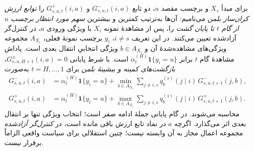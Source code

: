 برای مبدأ $X_s$ و برچسب مقصد $u$، دو تابع
$G^-_{s,u,t}(i,a)$ و $G^+_{s,u,t}(i,a)$
را \emph{توابع ارزش کران‌ساز بلمن} می‌نامیم: آن‌ها به‌ترتیب کمترین و بیشترین \emph{سهم مورد انتظار برچسب $u$ از گام $t$ تا پایان گشت} را، پس از مشاهدهٔ نمونه $X_i$ با ویژگی ورودی $a$، در کنترل‌گر آزادشده تعیین می‌کنند. در این تعریف $i\ne s$، $y_i$ برچسب نمونهٔ فعلی، $A_{X_i}$ مجموعه ویژگی‌های مشاهده‌شدهٔ آن و $b\in A_{X_i}$ ویژگی انتخابیِ انتقال بعدی است. پاداش مشاهدهٔ گام $t$ برابر $\alpha_t^{(H)}\mathbf1\{y_i=u\}$ است. با شرط پایانی $G^\pm_{s,u,H+1}(i,a)=0$، \emph{بازگشت‌های کمینه و بیشینهٔ بلمن} برای $t=H,\ldots,1$ به‌صورت
\begin{equation}\label{eq:ch3-bellman-value-recursion}
\boxed{\begin{aligned}
G^-_{s,u,t}(i,a)
&=\alpha_t^{(H)}\mathbf1\{y_i=u\}
+\min_{b\in A_{X_i}}\sum_{j\ne i,s}
q_b^{(s)}(j\mid i)\,G^-_{s,u,t+1}(j,b),\\
G^+_{s,u,t}(i,a)
&=\alpha_t^{(H)}\mathbf1\{y_i=u\}
+\max_{b\in A_{X_i}}\sum_{j\ne i,s}
q_b^{(s)}(j\mid i)\,G^+_{s,u,t+1}(j,b).
\end{aligned}}
\end{equation}
محاسبه می‌شوند. در گام پایانی جملهٔ ادامه صفر است؛ انتخاب ویژگی تنها بر انتقال بعدی اثر می‌گذارد. اگرچه $a$ در نماد تابع ارزش باقی مانده است، در \emph{کنترل‌گر آزادشده} مجموعه اعمال مجاز به آن وابسته نیست؛ چنین استقلالی برای سیاست واقعی الزاماً برقرار نیست.

